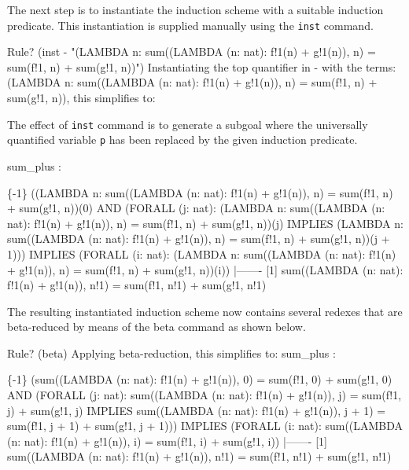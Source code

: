 \documentclass[12pt,twoside]{book}
\makeatletter
\newcommand{\indextt}[1]{\index{#1@{\texttt{#1}}}} %
\newcommand{\indtt}[1]{\texttt{#1}\index{#1@{\texttt{#1}}}}  %
\makeatother
\begin{document}
The next step is to instantiate the induction scheme with a suitable
induction predicate.  This instantiation is supplied manually using
the \indtt{inst} command.   
\begin{smallsession}\indextt{inst}
Rule? (inst - "(LAMBDA n: sum((LAMBDA (n: nat): f!1(n) + g!1(n)), n)
          = sum(f!1, n) + sum(g!1, n))")
Instantiating the top quantifier in - with the terms: 
 (LAMBDA n: sum((LAMBDA (n: nat): f!1(n) + g!1(n)), n)
          = sum(f!1, n) + sum(g!1, n)),
this simplifies to:
\end{smallsession}
The effect of \indtt{inst} command is to generate a subgoal
where the universally quantified variable \texttt{p} has been
replaced by the given induction predicate.
\begin{smallsession}
sum_plus :  

\{-1\}   ((LAMBDA n:
          sum((LAMBDA (n: nat): f!1(n) + g!1(n)), n)
              = sum(f!1, n) + sum(g!1, n))(0)
           AND
         (FORALL (j: nat):
            (LAMBDA n:
               sum((LAMBDA (n: nat): f!1(n) + g!1(n)), n)
                   = sum(f!1, n) + sum(g!1, n))(j)
                IMPLIES
              (LAMBDA n:
                 sum((LAMBDA (n: nat): f!1(n) + g!1(n)), n)
                     = sum(f!1, n) + sum(g!1, n))(j
                                                      + 1)))
          IMPLIES
        (FORALL (i: nat):
           (LAMBDA n:
              sum((LAMBDA (n: nat): f!1(n) + g!1(n)), n)
                  = sum(f!1, n) + sum(g!1, n))(i))
  |-------
[1]   sum((LAMBDA (n: nat): f!1(n) + g!1(n)), n!1)
          = sum(f!1, n!1) + sum(g!1, n!1)

\end{smallsession}

The resulting instantiated induction scheme now contains several
redexes that are beta-reduced by means of the {\rm beta} command
as shown below.
\begin{smallsession}\indextt{beta}
Rule? (beta)
Applying beta-reduction,
this simplifies to: 
sum_plus :  

\{-1\}   (sum((LAMBDA (n: nat): f!1(n) + g!1(n)), 0) = sum(f!1, 0) + sum(g!1, 0)
           AND
         (FORALL (j: nat):
            sum((LAMBDA (n: nat): f!1(n) + g!1(n)), j)
                = sum(f!1, j) + sum(g!1, j)
                IMPLIES sum((LAMBDA (n: nat): f!1(n) + g!1(n)), j + 1)
                  = sum(f!1, j + 1) + sum(g!1, j + 1)))
          IMPLIES
        (FORALL (i: nat):
           sum((LAMBDA (n: nat): f!1(n) + g!1(n)), i)
               = sum(f!1, i) + sum(g!1, i))
  |-------
[1]   sum((LAMBDA (n: nat): f!1(n) + g!1(n)), n!1)
          = sum(f!1, n!1) + sum(g!1, n!1)

\end{smallsession}
\end{document}
